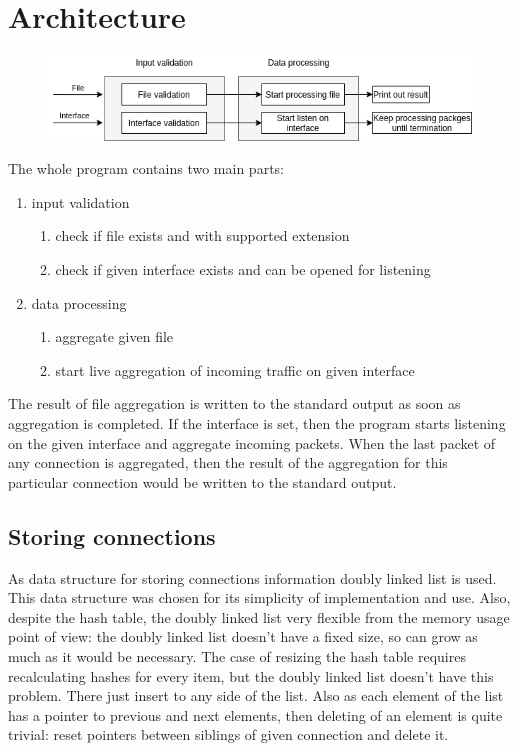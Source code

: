 \documentclass[12pt,a4paper]{article}
\begin{document}
    \section{Architecture}
    \begin{center}
        \begin{figure}[h!]
            \includegraphics[scale=0.7]{sslsniff.png}
        \end{figure}
    \end{center}
    The whole program contains two main parts:
    \begin{enumerate}
        \item input validation
        \begin{enumerate}
            \item check if file exists and with supported extension
            \item check if given interface exists and can be opened for listening
        \end{enumerate}
        \item data processing
        \begin{enumerate}
            \item aggregate given file
            \item start live aggregation of incoming traffic on given interface
        \end{enumerate}
    \end{enumerate}
    The result of file aggregation is written to the standard output as soon as
    aggregation is completed. If the interface is set, then the program starts 
    listening on the given interface and aggregate incoming packets. When the 
    last packet of any connection is aggregated, then the result of the 
    aggregation for this particular connection would be written to the standard output. 

    \subsection{Storing connections}
    As data structure for storing connections information doubly linked list is used.
    This data structure was chosen for its simplicity of implementation and use. 
    Also, despite the hash table, the doubly linked list very flexible from the 
    memory usage point of view: the doubly linked list doesn't have a fixed size, 
    so can grow as much as it would be necessary. The case of resizing the hash 
    table requires recalculating hashes for every item, but the doubly linked list 
    doesn't have this problem. There just insert to any side of the list. Also as 
    each element of the list has a pointer to previous and next elements, then 
    deleting of an element is quite trivial: reset pointers between siblings of 
    given connection and delete it.
\end{document}
